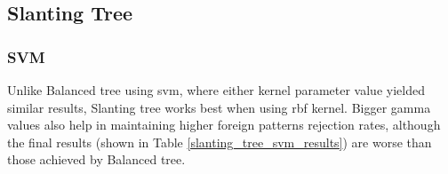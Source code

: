 \subsection{Slanting Tree}

\subsubsection{SVM}

Unlike Balanced tree using svm, where either kernel parameter value yielded similar results, Slanting tree works best when using rbf kernel. Bigger gamma values also help in maintaining higher foreign patterns rejection rates, although the final results (shown in Table \ref{slanting_tree_svm_results}) are worse than those achieved by Balanced tree.

\begin{table}[htp]
	\centering
	\caption{Results for Slanting tree using SVM classifier with C=16, gamma=0.5 and kernel=rbf}
	\label{slanting_tree_svm_results}
\end{table}
